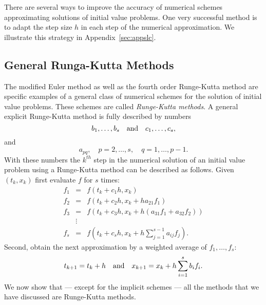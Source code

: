 \documentclass{ximera}
\begin{document}
There are several ways to improve the accuracy of 
numerical schemes approximating solutions of initial value problems. 
One very successful method is to adapt the step size $h$ in each
step of the numerical approximation.  We illustrate this
strategy in Appendix~\ref{sec:appslc}.


\subsection*{General Runga-Kutta Methods}

The modified Euler method as well as the fourth order Runge-Kutta
method are specific examples of a general class of 
numerical schemes for the solution of initial value 
problems.
These schemes are called {\em Runge-Kutta methods}.  A general explicit 
Runge-Kutta method is fully described by numbers
\[
b_1,\ldots,b_s\quad\mbox{and}\quad c_1,\ldots,c_s,
\]
and 
\[
a_{pq}, \quad p=2,\ldots,s,\quad q=1,\ldots,p-1.
\]
With these numbers the $k^{th}$ step in the numerical solution of an 
initial value problem using a Runge-Kutta method can be described
as follows. Given $(t_k,x_k)$ first evaluate $f$ for $s$ times:
\begin{eqnarray*}
f_1 & = & f\left( t_k+c_1 h, x_k \right)\\
f_2 & = & f\left( t_k+c_2 h, x_k +ha_{21} f_1\right)\\
f_3 & = & f\left( t_k+c_3 h, x_k +h(a_{31} f_1 + a_{32} f_2)\right)\\
& \vdots &\\
f_s & = & f\left( t_k+c_s h, x_k +h\sum_{j=1}^{s-1}a_{ij} f_j\right).
\end{eqnarray*}
Second, obtain the next approximation by a weighted average
of $f_1,\ldots,f_s$:
\[
t_{k+1} = t_k+h \quad\mbox{and}\quad x_{k+1} = x_k + h\sum_{i=1}^s b_i f_i.
\]
We now show that --- except for the implicit schemes ---
all the methods that we have discussed are Runge-Kutta methods.
\end{document}
